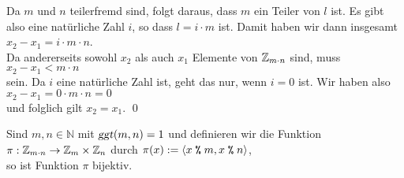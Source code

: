 \begin{enumerate}
      Da $m$ und $n$ teilerfremd sind, folgt daraus, dass $m$ ein Teiler von $l$ ist.  Es gibt also eine
      nat\"{u}rliche Zahl $i$, so dass $l = i \cdot m$ ist.  Damit haben wir dann insgesamt
      \\[0.2cm]
      \hspace*{1.3cm}
      $x_2 - x_1 = i \cdot m \cdot n$.
      \\[0.2cm]
      Da andererseits sowohl $x_2$ als auch $x_1$ Elemente von $\mathbb{Z}_{m \cdot n}$ sind, muss
      \\[0.2cm]
      \hspace*{1.3cm}
      $x_2 - x_1 < m \cdot n$
      \\[0.2cm]
      sein.  Da $i$ eine nat\"{u}rliche Zahl ist, geht das nur, wenn $i = 0$ ist.  Wir haben also
      \\[0.2cm]
      \hspace*{1.3cm}
      $x_2 - x_1 = 0 \cdot m \cdot n = 0$
      \\[0.2cm]
      und folglich gilt $x_2 = x_1$. \qed
\end{enumerate}


\begin{Korollar} \label{satz:china2} \lb
Sind $m,n \in \mathbb{N}$ mit $\textsl{ggt}(m,n) =1$ und definieren
 wir die Funktion 
\\[0.2cm]
\hspace*{1.3cm}
$\pi : \mathbb{Z}_{m \cdot n} \rightarrow \mathbb{Z}_{m} \times \mathbb{Z}_{n}$ \quad durch \quad
$\pi(x) := \langle x \;\texttt{\%}\; m, x \;\texttt{\%}\; n \rangle$,
\\[0.2cm]
so ist Funktion $\pi$ bijektiv.  
\end{Korollar}


